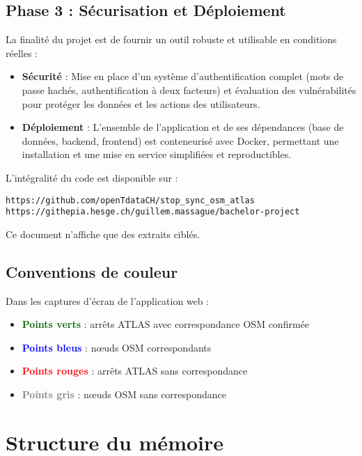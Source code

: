 \subsection*{Phase 3 : Sécurisation et Déploiement}
La finalité du projet est de fournir un outil robuste et utilisable en conditions réelles :
\begin{itemize}
    \item \textbf{Sécurité} : Mise en place d'un système d'authentification complet (mots de passe hachés, authentification à deux facteurs) et évaluation des vulnérabilités pour protéger les données et les actions des utilisateurs.
    \item \textbf{Déploiement} : L'ensemble de l'application et de ses dépendances (base de données, backend, frontend) est conteneurisé avec Docker, permettant une installation et une mise en service simplifiées et reproductibles.
\end{itemize}

L'intégralité du code est disponible sur :
\begin{center}
\texttt{https://github.com/openTdataCH/stop\_sync\_osm\_atlas}\\
\texttt{https://githepia.hesge.ch/guillem.massague/bachelor-project}
\end{center}

Ce document n'affiche que des extraits ciblés. 

\subsection*{Conventions de couleur}

Dans les captures d'écran de l'application web :
\begin{itemize}
   \item \textcolor{darkgreen}{\textbf{Points verts}} : arrêts ATLAS avec correspondance OSM confirmée
   \item \textcolor{blue}{\textbf{Points bleus}} : nœuds OSM correspondants
   \item \textcolor{red}{\textbf{Points rouges}} : arrêts ATLAS sans correspondance
   \item \textcolor{gray}{\textbf{Points gris}} : nœuds OSM sans correspondance
\end{itemize}

\section*{Structure du mémoire}

